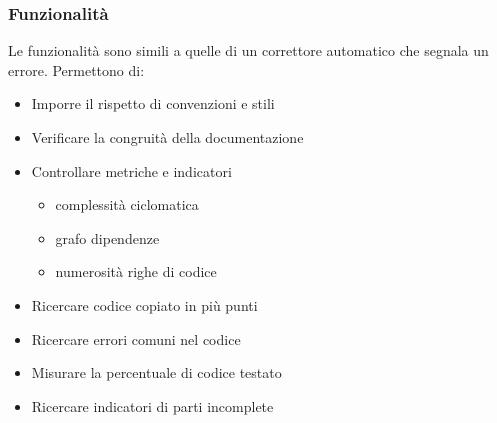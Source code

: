 \subsubsection{Funzionalità}
Le funzionalità sono simili a quelle di un correttore automatico che segnala un errore. Permettono di:
\begin{itemize}
    \item Imporre il rispetto di convenzioni e stili
    \item Verificare la congruità della documentazione
    \item Controllare metriche e indicatori
    \begin{itemize}
        \item complessità ciclomatica
        \item grafo dipendenze
        \item numerosità righe di codice
    \end{itemize}
    \item Ricercare codice copiato in più punti
    \item Ricercare errori comuni nel codice
    \item Misurare la percentuale di codice testato
    \item Ricercare indicatori di parti incomplete
\end{itemize}

\newpage